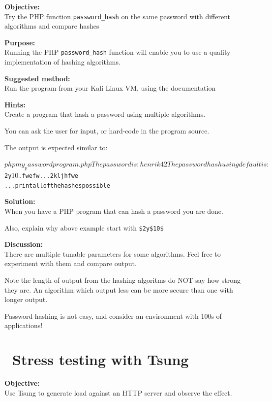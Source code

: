 \documentclass[a4paper,11pt,notitlepage]{report}
\begin{document}
{\bf Objective:}\\
Try the PHP function \verb+password_hash+ on the same password with different algorithms and compare hashes


{\bf Purpose:}\\
Running the PHP \verb+password_hash+ function will enable you to use a quality implementation of hashing algorithms.


{\bf Suggested method:}\\
Run the program from your Kali Linux VM, using the documentation\\


{\bf Hints:}\\
Create a program that hash a password using multiple algorithms.

You can ask the user for input, or hard-code in the program source.

The output is expected similar to:

\begin{alltt}
$ php my_passwordprogram.php
The password is: henrik42
The password hash using default is: $2y$10$.fwefw...2kljhfwe
... print all of the hashes possible
\end{alltt}


{\bf Solution:}\\
When you have a PHP program that can hash a password you are done.

Also, explain why above example start with \verb+$2y$10$+

{\bf Discussion:}\\
There are multiple tunable parameters for some algorithms. Feel free to experiment with them and compare output.

Note the length of output from the hashing algoritms do NOT say how strong they are. An algorithm which output less can be more secure than one with longer output.

Password hashing is not easy, and consider an environment with 100s of applications!

\chapter{\faInfoCircle\ Stress testing with Tsung}
\label{ex:tsung}

{\bf Objective:}\\
Use Tsung to generate load against an HTTP server and observe the effect.
\end{document}
